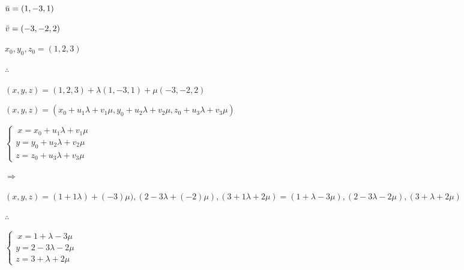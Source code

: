 \documentclass{article}
\def\lthtmlcheckvsize{\ifdim\ht\sizebox<\vsize 
  \ifdim\wd\sizebox<\hsize\expandafter\hfill\fi \expandafter\vfill
  \else\expandafter\vss\fi}%
\begin{document}
{\newpage\clearpage
{}%
$ \Bar{u}=(1,-3,1)$%
\lthtmlindisplaymathZ
\lthtmlcheckvsize\clearpage}

{\newpage\clearpage
{}%
$ \Bar{v}=(-3,-2,2)$%
\lthtmlindisplaymathZ
\lthtmlcheckvsize\clearpage}

{\newpage\clearpage
{}%
$ x_{0},y_{0}, z_{0}=(1,2,3)$%
\lthtmlindisplaymathZ
\lthtmlcheckvsize\clearpage}

{\newpage\clearpage
{}%

$ \therefore$%
\lthtmlindisplaymathZ
\lthtmlcheckvsize\clearpage}

{\newpage\clearpage
{}%
$ (x,y,z)=(1,2,3)+\lambda(1,-3,1)+\mu(-3,-2,2)$%
\lthtmlindisplaymathZ
\lthtmlcheckvsize\clearpage}

{\newpage\clearpage
{}%
$ (x,y,z)=(x_{0}+u_{1}\lambda+v_{1}\mu,y_{0}+u_{2}\lambda+v_{2}\mu,z_{0}+u_{3}\lambda+v_{3}\mu)$%
\lthtmlindisplaymathZ
\lthtmlcheckvsize\clearpage}

{\newpage\clearpage
{}%
$ \left \{
      \begin{array}{rcl}
          \  x=x_{0}+u_{1}\lambda+v_{1}\mu\\
          y=y_{0}+u_{2}\lambda+v_{2}\mu \\
         z=z_{0}+u_{3}\lambda+v_{3}\mu 
      \end{array}
   \right . $%
\lthtmlindisplaymathZ
\lthtmlcheckvsize\clearpage}

{\newpage\clearpage
{}%
$ \Rightarrow$%
\lthtmlindisplaymathZ
\lthtmlcheckvsize\clearpage}

{\newpage\clearpage
{}%
$ (x,y,z)=(1+1\lambda)+(-3)\mu),(2-3\lambda+(-2)\mu),(3+1\lambda+2\mu)=(1+\lambda-3\mu),(2-3\lambda-2\mu),(3+\lambda+2\mu)$%
\lthtmlindisplaymathZ
\lthtmlcheckvsize\clearpage}

{\newpage\clearpage
{}%

$ \therefore$%
\lthtmlindisplaymathZ
\lthtmlcheckvsize\clearpage}

{\newpage\clearpage
{}%
$ \left \{
      \begin{array}{rcl}
          \  x=1+\lambda-3\mu\\
          y=2-3\lambda-2\mu \\
         z=3+\lambda+2\mu 
      \end{array}
   \right . $%
\lthtmlindisplaymathZ
\lthtmlcheckvsize\clearpage}
\end{document}

